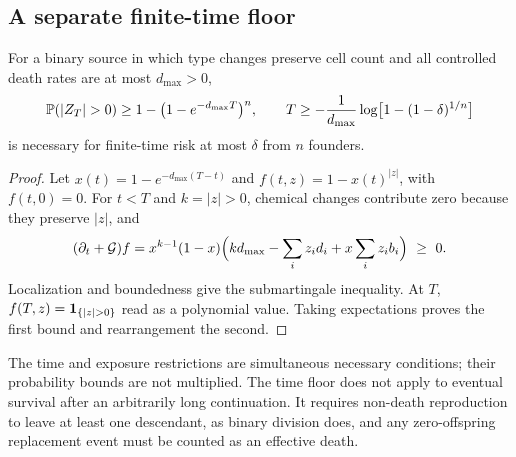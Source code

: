 \subsection{A separate finite-time floor}

\begin{proposition}\label{prop:time}
For a binary source in which type changes preserve cell count and all controlled
death rates are at most $d_{\max}>0$,
\begin{equation}\label{eq:time}
 \Prob(|Z_T|>0)\ge1-\bigl(1-e^{-d_{\max}T}\bigr)^n,\qquad
 T\ge-\frac1{d_{\max}}\log\bigl[1-(1-\delta)^{1/n}\bigr]
\end{equation}
is necessary for finite-time risk at most $\delta$ from $n$ founders.
\end{proposition}

\begin{proof}
Let $x(t)=1-e^{-d_{\max}(T-t)}$ and $f(t,z)=1-x(t)^{|z|}$, with $f(t,0)=0$.
For $t<T$ and $k=|z|>0$, chemical changes contribute zero because they preserve
$|z|$, and
\[
 (\partial_t+\mathcal G)f
 =x^{k-1}(1-x)\Bigl(kd_{\max}-\sum_iz_id_i+x\sum_iz_ib_i\Bigr)\ \ge\ 0 .
\]
Localization and boundedness give the submartingale inequality. At $T$,
$f(T,z)=\one_{\{|z|>0\}}$ read as a polynomial value. Taking expectations proves
the first bound and rearrangement the second.
\end{proof}

The time and exposure restrictions are simultaneous necessary conditions; their
probability bounds are not multiplied. The time floor does not apply to eventual
survival after an arbitrarily long continuation. It requires non-death
reproduction to leave at least one descendant, as binary division does, and any
zero-offspring replacement event must be counted as an effective death.
